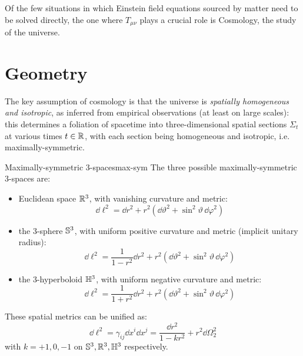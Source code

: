 
Of the few situations in which Einstein field equations sourced by matter  need to be solved directly, the one where $ T_{\mu \nu} $ plays a crucial role is Cosmology, the study of the universe.

\section{Geometry}

The key assumption of cosmology is that the universe is \emph{spatially homogeneous and isotropic}, as inferred from empirical observations (at least on large scales): this determines a foliation of spacetime into three-dimensional spatial sections $ \Sigma_t $ at various times $ t \in \mathbb{R} $, with each section being homogeneous and isotropic, i.e. maximally-symmetric.

\begin{lemma}{Maximally-symmetric 3-spaces}{max-sym}
  The three possible maximally-symmetric 3-spaces are:
  \begin{itemize}
    \item Euclidean space $ \mathbb{R}^3 $, with vanishing curvature and metric:
      \begin{equation*}
        \dd \ell^2 = \dd r^2 + r^2 \left( \dd \vartheta^2 + \sin^2 \vartheta\, \dd \varphi^2 \right)
      \end{equation*}
    \item the 3-sphere $ \mathbb{S}^{3} $, with uniform positive curvature and metric (implicit unitary radius):
      \begin{equation*}
        \dd \ell^2 = \frac{1}{1 - r^2} \dd r^2 + r^2 \left( \dd \vartheta^2 + \sin^2 \vartheta\, \dd \varphi^2 \right)
      \end{equation*}
    \item the 3-hyperboloid $ \mathbb{H}^{3} $, with uniform negative curvature and metric:
      \begin{equation*}
        \dd \ell^2 = \frac{1}{1 + r^2} \dd r^2 + r^2 \left( \dd \vartheta^2 + \sin^2 \vartheta\, \dd \varphi^2 \right)
      \end{equation*}
  \end{itemize}
  These spatial metrics can be unified as:
  \begin{equation}
    \dd \ell^2 = \gamma_{ij} \dd x^i \dd x^j = \frac{\dd r^2}{1 - kr^2} + r^2 \dd \Omega_2^2
  \end{equation}
  with $ k = +1,0,-1 $ on $ \mathbb{S}^{3}, \mathbb{R}^3, \mathbb{H}^{3} $ respectively. 
\end{lemma}


